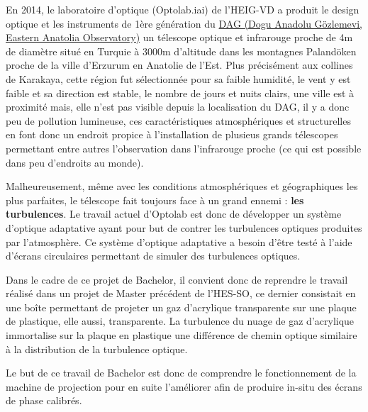 
En 2014, le laboratoire d'optique (Optolab.iai) de l'HEIG-VD a produit le design optique et les instruments de 1ère génération du \href{https://atasam.atauni.edu.tr/}{DAG (Dogu Anadolu Gözlemevi, Eastern Anatolia Observatory)}\footnotemark
un télescope optique et infrarouge proche de 4m de diamètre situé en Turquie à 3000m d'altitude dans les montagnes Palandöken proche de la ville d'Erzurum en Anatolie de l'Est. Plus précisément aux collines de Karakaya, cette région fut sélectionnée pour sa faible humidité, le vent y est faible et sa direction est stable,
le nombre de jours et nuits clairs, une ville est à proximité mais, elle n'est pas visible depuis la localisation du DAG, il y a donc peu de pollution lumineuse, ces caractéristiques atmosphériques et structurelles en font donc un endroit propice à l'installation de plusieus grands télescopes permettant entre autres l'observation
dans l'infrarouge proche (ce qui est possible dans peu d'endroits au monde).

Malheureusement, même avec les conditions atmosphériques et géographiques les plus parfaites, le télescope fait toujours face à un grand ennemi : \textbf{les turbulences}.
Le travail actuel d'Optolab est donc de développer un système d'optique adaptative ayant pour but de contrer les turbulences optiques produites par l'atmosphère. Ce système
d'optique adaptative a besoin d'être testé à l'aide d'écrans circulaires permettant de simuler des turbulences optiques.

Dans le cadre de ce projet de Bachelor, il convient donc de reprendre le travail réalisé dans un projet de Master précédent de l'HES-SO, ce dernier consistait en une boîte permettant de projeter un gaz d'acrylique transparente sur une plaque de plastique, elle aussi, transparente. La turbulence du nuage de gaz
d'acrylique immortalise sur la plaque en plastique une différence de chemin optique similaire à la distribution de la turbulence optique.

Le but de ce travail de Bachelor est donc de comprendre le fonctionnement de la machine de projection pour en suite l'améliorer afin de produire in-situ des écrans de phase calibrés.

\newpage

